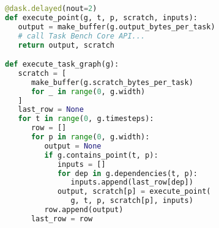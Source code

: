 \begin{lstlisting}[language=Python,caption={Excerpt from Task Bench implementation in Dask.},label={lst:code-sample},float]
@dask.delayed(nout=2)
def execute_point(g, t, p, scratch, inputs):
   output = make_buffer(g.output_bytes_per_task)
   # call Task Bench Core API...
   return output, scratch

def execute_task_graph(g):
   scratch = [
      make_buffer(g.scratch_bytes_per_task)
      for _ in range(0, g.width)
   ]
   last_row = None
   for t in range(0, g.timesteps):
      row = []
      for p in range(0, g.width):
         output = None
         if g.contains_point(t, p):
            inputs = []
            for dep in g.dependencies(t, p):
               inputs.append(last_row[dep])
            output, scratch[p] = execute_point(
               g, t, p, scratch[p], inputs)
         row.append(output)
      last_row = row
\end{lstlisting}
